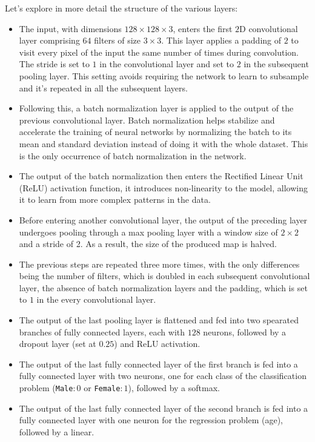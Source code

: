 Let's explore in more detail the structure of the various layers:
\begin{itemize}
    \item The input, with dimensions $128\times128\times3$, enters
    the first $2$D convolutional layer comprising $64$ filters of size $3\times3$.
    This layer applies a padding of $2$ to visit every pixel
    of the input the same number of times
    during convolution. The stride is set to $1$
    in the convolutional layer and set to $2$ in the subsequent 
    pooling layer. This setting avoids requiring the network to learn
    to subsample and it's repeated in all the subsequent layers.
    \item Following this, a batch normalization layer is applied
    to the output of the previous convolutional layer.
    Batch normalization helps stabilize and accelerate
    the training of neural networks by normalizing the batch to its
    mean and standard deviation instead of doing it with the whole dataset.
    This is the only occurrence of batch normalization in the network.
    \item The output of the batch normalization then enters
    the Rectified Linear Unit (ReLU) activation function,
    it introduces non-linearity to the model,
    allowing it to learn from more complex patterns in the data.
    \item Before entering another convolutional layer,
    the output of the preceding layer undergoes pooling through
    a max pooling layer with a window size of $2\times2$ and a stride of 2.
    As a result, the size of the produced map is halved.
    \item The previous steps are repeated three more times,
    with the only differences being the number of filters,
    which is doubled in each subsequent convolutional layer,
    the absence of batch normalization layers and the padding,
    which is set to $1$ in the every convolutional layer.
    \item The output of the last pooling layer is flattened
    and fed into two spearated branches of fully connected layers,
    each with $128$ neurons,
    followed by a dropout layer (set at $0.25$) and ReLU activation.
    \item The output of the last fully connected layer of the first branch
    is fed into a fully connected layer with two neurons,
    one for each class of the classification problem
    (\texttt{Male}$: 0$ or \texttt{Female}$: 1$), followed by a softmax.
    \item The output of the last fully connected layer of the second branch
    is fed into a fully connected layer with one neuron
    for the regression problem (age), followed by a linear.
\end{itemize}

